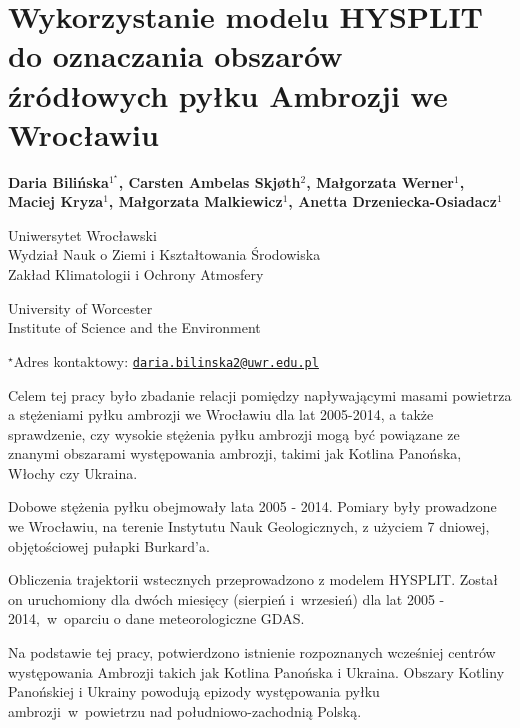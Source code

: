 \documentclass[\main/boa.tex]{subfiles}
\begin{document}
\section{Wykorzystanie modelu HYSPLIT do oznaczania obszarów źródłowych pyłku Ambrozji we Wrocławiu}

\begin{center}
  {\bf {} Daria Bilińska$^{1^\star}$,  Carsten Ambelas Skjøth$^{2}$,  Małgorzata Werner$^{1}$,  Maciej Kryza$^{1}$,  Małgorzata Malkiewicz$^{1}$,  Anetta Drzeniecka-Osiadacz$^{1}$}
\end{center}

\vskip 0.3cm

\begin{affiliations}
\begin{enumerate}
\begin{minipage}{0.915\textwidth}
\centering
\item Uniwersytet Wrocławski\\ Wydział Nauk o Ziemi i Kształtowania Środowiska\\Zakład Klimatologii i Ochrony Atmosfery\\[-2pt]
\item University of Worcester\\ Institute of Science and the Environment\\[-2pt]
\end{minipage}
\end{enumerate}
$^\star$Adres kontaktowy: \href{mailto:daria.bilinska2@uwr.edu.pl}{\nolinkurl{daria.bilinska2@uwr.edu.pl}}\\
\end{affiliations}

\vskip 0.5cm


\vskip 0.5cm

Celem tej pracy było zbadanie relacji pomiędzy napływającymi masami powietrza a stężeniami pyłku ambrozji we Wrocławiu dla lat 2005-2014, a także sprawdzenie, czy wysokie stężenia pyłku ambrozji mogą być powiązane ze znanymi obszarami występowania ambrozji, takimi jak Kotlina Panońska, Włochy czy Ukraina.


Dobowe stężenia pyłku obejmowały lata 2005 - 2014. Pomiary były prowadzone we Wrocławiu, na terenie Instytutu Nauk Geologicznych, z użyciem 7 dniowej, objętościowej pułapki Burkard’a. 


Obliczenia trajektorii wstecznych przeprowadzono z modelem HYSPLIT. Został on uruchomiony dla dwóch miesięcy (sierpień i wrzesień) dla lat 2005 - 2014,~w~oparciu o dane meteorologiczne GDAS.


Na podstawie tej pracy, potwierdzono istnienie rozpoznanych wcześniej centrów występowania Ambrozji takich jak Kotlina Panońska i Ukraina. Obszary Kotliny Panońskiej i Ukrainy powodują epizody występowania pyłku ambrozji~w~powietrzu nad południowo-zachodnią Polską.
\end{document}
